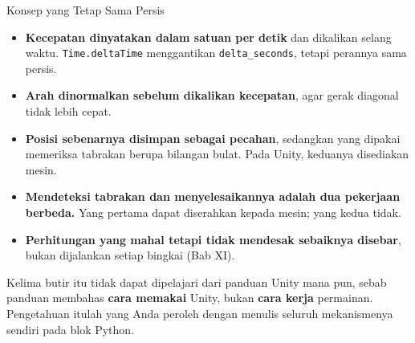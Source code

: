 \documentclass[aspectratio=169,10pt]{beamer}
\begin{document}
\begin{frame}{Konsep yang Tetap Sama Persis}
\begin{itemize}
  \item \textbf{Kecepatan dinyatakan dalam satuan per detik} dan dikalikan
        selang waktu. \texttt{Time.deltaTime} menggantikan
        \texttt{delta\_seconds}, tetapi perannya sama persis.
  \item \textbf{Arah dinormalkan sebelum dikalikan kecepatan}, agar gerak
        diagonal tidak lebih cepat.
  \item \textbf{Posisi sebenarnya disimpan sebagai pecahan}, sedangkan yang
        dipakai memeriksa tabrakan berupa bilangan bulat. Pada Unity, keduanya
        disediakan mesin.
  \item \textbf{Mendeteksi tabrakan dan menyelesaikannya adalah dua pekerjaan
        berbeda.} Yang pertama dapat diserahkan kepada mesin; yang kedua tidak.
  \item \textbf{Perhitungan yang mahal tetapi tidak mendesak sebaiknya
        disebar}, bukan dijalankan setiap bingkai (Bab XI).
\end{itemize}
\vspace{0.12cm}
\begin{kotak}
Kelima butir itu tidak dapat dipelajari dari panduan Unity mana pun, sebab
panduan membahas \textbf{cara memakai} Unity, bukan \textbf{cara kerja}
permainan. Pengetahuan itulah yang Anda peroleh dengan menulis seluruh
mekanismenya sendiri pada blok Python.
\end{kotak}
\end{frame}
\end{document}
